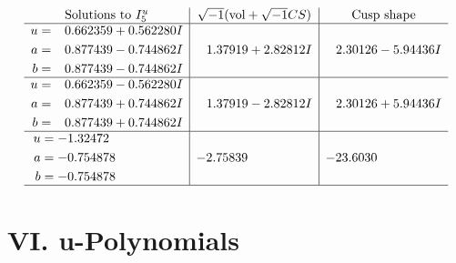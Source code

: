 \documentclass[1p]{elsarticle_modified}
\theoremstyle{definition}
\newcommand{\I}{\sqrt{-1}}
\begin{document}
$$\begin{array}{c|c|c}  
\text{Solutions to }I^u_{5}& \I (\text{vol} + \sqrt{-1}CS) & \text{Cusp shape}\\
 \hline 
\begin{aligned}
u &= \phantom{-}0.662359 + 0.562280 I \\
a &= \phantom{-}0.877439 - 0.744862 I \\
b &= \phantom{-}0.877439 - 0.744862 I\end{aligned}
 & \phantom{-}1.37919 + 2.82812 I & \phantom{-}2.30126 - 5.94436 I \\ \hline\begin{aligned}
u &= \phantom{-}0.662359 - 0.562280 I \\
a &= \phantom{-}0.877439 + 0.744862 I \\
b &= \phantom{-}0.877439 + 0.744862 I\end{aligned}
 & \phantom{-}1.37919 - 2.82812 I & \phantom{-}2.30126 + 5.94436 I \\ \hline\begin{aligned}
u &= -1.32472\phantom{ +0.000000I} \\
a &= -0.754878\phantom{ +0.000000I} \\
b &= -0.754878\phantom{ +0.000000I}\end{aligned}
 & -2.75839\phantom{ +0.000000I} & -23.6030\phantom{ +0.000000I}\\
 \hline 
 \end{array}$$\newpage
\newpage\renewcommand{\arraystretch}{1}
\centering \section*{ VI. u-Polynomials}
\end{document}
